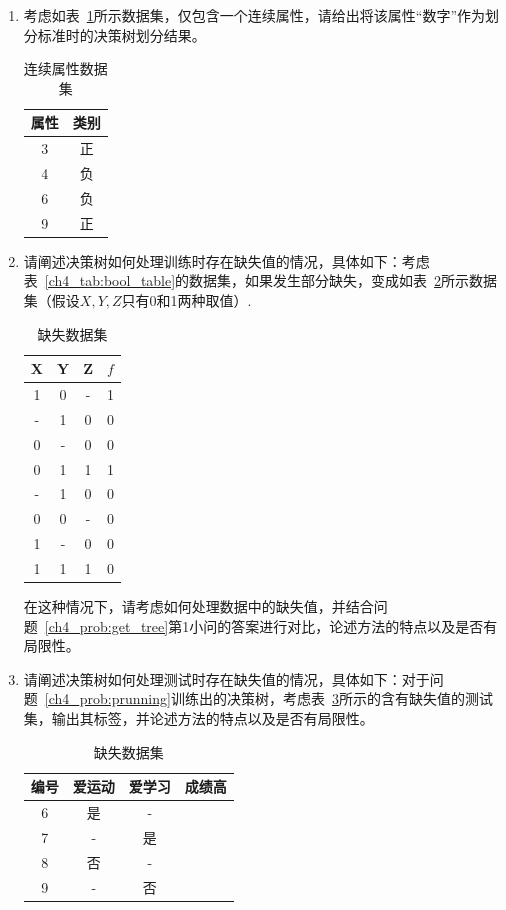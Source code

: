 \documentclass[answers]{exam}  %
\begin{document}
\begin{questions}
\begin{enumerate}
	\item 
    考虑如表~\ref{ch4_tab:continuous_small_dataset}所示数据集，仅包含一个连续属性，请给出将该属性“数字”作为划分标准时的决策树划分结果。
    \begin{table}[h]
    \begin{center}
    \begin{tabular}{cc}
    \hline 属性 & 类别 \\
    \hline 3 & 正 \\
    4 & 负 \\
    6 & 负 \\
    9 & 正 \\
    \hline
    \end{tabular}
    \caption{连续属性数据集}\label{ch4_tab:continuous_small_dataset}
    \end{center}
    \end{table}
	\item 请阐述决策树如何处理训练时存在缺失值的情况，具体如下：考虑表~\ref{ch4_tab:bool_table}的数据集，如果发生部分缺失，变成如表~\ref{ch4_tab:missing_dataset}所示数据集（假设$X, Y, Z$只有0和1两种取值）.
    \begin{table}[ht]
    \centering
    \caption{缺失数据集}\label{ch4_tab:missing_dataset}
    \begin{tabular}{ccc|c}
        \hline X & Y & Z & $f$ \\
        \hline 
        1 & 0 & - & 1\\
        - & 1 & 0 & 0\\
        0 & - & 0 & 0\\
        0 & 1 & 1 & 1\\
        - & 1 & 0 & 0\\
        0 & 0 & - & 0\\
        1 & - & 0 & 0\\
        1 & 1 & 1 & 0\\
        \hline
    \end{tabular}
\end{table}
    在这种情况下，请考虑如何处理数据中的缺失值，并结合问题~\ref{ch4_prob:get_tree}第1小问的答案进行对比，论述方法的特点以及是否有局限性。
	\item 请阐述决策树如何处理测试时存在缺失值的情况，具体如下：对于问题~\ref{ch4_prob:prunning}训练出的决策树，考虑表~\ref{ch4_tab:artificial_testing_dataset2}所示的含有缺失值的测试集，输出其标签，并论述方法的特点以及是否有局限性。
	\begin{table}[ht]
    \centering
    \caption{缺失数据集}\label{ch4_tab:artificial_testing_dataset2}
	\begin{tabular}{cccc}
		\hline 编号 & 爱运动 & 爱学习 & 成绩高 \\
		\hline 6 & 是 & - &  \\
		7 & - & 是 &  \\
		8 & 否 & - &  \\
		9 & - & 否 &  \\
		\hline
	\end{tabular}
	\end{table}
    

\end{enumerate}
\end{questions}
\end{document}

